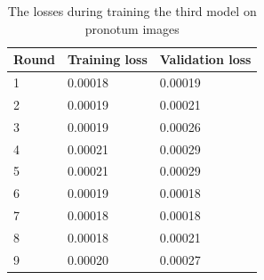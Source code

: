\documentclass[review]{elsarticle}
\begin{document}
\begin{table}[h!]
	\centering
	\begin{tabular}{l l l}
	Round & Training loss & Validation loss \\ \hline
	1 & 0.00018 & 0.00019  \\ \hline
	2 & 0.00019 & 0.00021 \\ \hline
	3 & 0.00019 & 0.00026 \\ \hline
	4 & 0.00021 & 0.00029 \\ \hline
	5 & 0.00021 & 0.00029 \\ \hline
	6 & 0.00019 & 0.00018 \\ \hline
	7 & 0.00018 & 0.00018 \\ \hline
	8 & 0.00018 & 0.00021 \\ \hline
	9 & 0.00020 & 0.00027 \\ \hline
	\end{tabular}
	\caption{\small{The losses during training the third model on pronotum images}}
	\label{tbltrainingloss}
\end{table}
\end{document}
